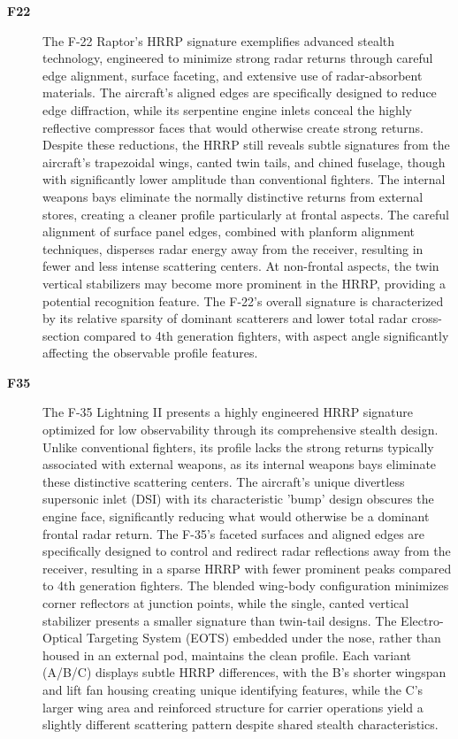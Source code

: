 {\begin{description}
    \item[\textbf{F22}]
    The F-22 Raptor's HRRP signature exemplifies advanced stealth technology, engineered to minimize strong radar returns through careful edge alignment, surface faceting, and extensive use of radar-absorbent materials. The aircraft's aligned edges are specifically designed to reduce edge diffraction, while its serpentine engine inlets conceal the highly reflective compressor faces that would otherwise create strong returns. Despite these reductions, the HRRP still reveals subtle signatures from the aircraft's trapezoidal wings, canted twin tails, and chined fuselage, though with significantly lower amplitude than conventional fighters. The internal weapons bays eliminate the normally distinctive returns from external stores, creating a cleaner profile particularly at frontal aspects. The careful alignment of surface panel edges, combined with planform alignment techniques, disperses radar energy away from the receiver, resulting in fewer and less intense scattering centers. At non-frontal aspects, the twin vertical stabilizers may become more prominent in the HRRP, providing a potential recognition feature. The F-22's overall signature is characterized by its relative sparsity of dominant scatterers and lower total radar cross-section compared to 4th generation fighters, with aspect angle significantly affecting the observable profile features.

    \item[\textbf{F35}]
    The F-35 Lightning II presents a highly engineered HRRP signature optimized for low observability through its comprehensive stealth design. Unlike conventional fighters, its profile lacks the strong returns typically associated with external weapons, as its internal weapons bays eliminate these distinctive scattering centers. The aircraft's unique divertless supersonic inlet (DSI) with its characteristic 'bump' design obscures the engine face, significantly reducing what would otherwise be a dominant frontal radar return. The F-35's faceted surfaces and aligned edges are specifically designed to control and redirect radar reflections away from the receiver, resulting in a sparse HRRP with fewer prominent peaks compared to 4th generation fighters. The blended wing-body configuration minimizes corner reflectors at junction points, while the single, canted vertical stabilizer presents a smaller signature than twin-tail designs. The Electro-Optical Targeting System (EOTS) embedded under the nose, rather than housed in an external pod, maintains the clean profile. Each variant (A/B/C) displays subtle HRRP differences, with the B's shorter wingspan and lift fan housing creating unique identifying features, while the C's larger wing area and reinforced structure for carrier operations yield a slightly different scattering pattern despite shared stealth characteristics.


\end{description}}

